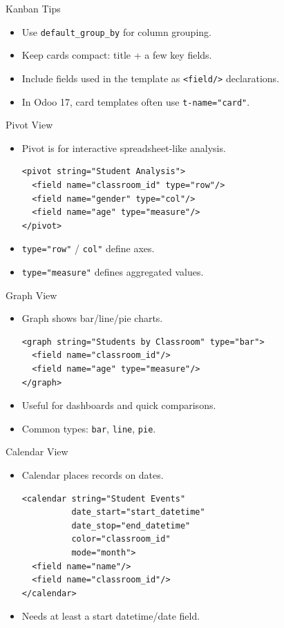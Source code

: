 \begin{frame}[fragile]{Kanban Tips}
	\begin{itemize}
		\item Use \texttt{default\_group\_by} for column grouping.
		\item Keep cards compact: title + a few key fields.
		\item Include fields used in the template as \texttt{<field/>} declarations.
		\item In Odoo 17, card templates often use \texttt{t-name="card"}.
	\end{itemize}
\end{frame}

\begin{frame}[fragile]{Pivot View}
	\begin{itemize}
		\item Pivot is for interactive spreadsheet-like analysis.
\begin{lstlisting}[style=xml]
<pivot string="Student Analysis">
  <field name="classroom_id" type="row"/>
  <field name="gender" type="col"/>
  <field name="age" type="measure"/>
</pivot>
\end{lstlisting}
		\item \texttt{type="row"} / \texttt{col"} define axes.
		\item \texttt{type="measure"} defines aggregated values.
	\end{itemize}
\end{frame}

\begin{frame}[fragile]{Graph View}
	\begin{itemize}
		\item Graph shows bar/line/pie charts.
\begin{lstlisting}[style=xml]
<graph string="Students by Classroom" type="bar">
  <field name="classroom_id"/>
  <field name="age" type="measure"/>
</graph>
\end{lstlisting}
		\item Useful for dashboards and quick comparisons.
		\item Common types: \texttt{bar}, \texttt{line}, \texttt{pie}.
	\end{itemize}
\end{frame}

\begin{frame}[fragile]{Calendar View}
	\begin{itemize}
		\item Calendar places records on dates.
\begin{lstlisting}[style=xml]
<calendar string="Student Events"
		  date_start="start_datetime"
		  date_stop="end_datetime"
		  color="classroom_id"
		  mode="month">
  <field name="name"/>
  <field name="classroom_id"/>
</calendar>
\end{lstlisting}
		\item Needs at least a start datetime/date field.
	\end{itemize}
\end{frame}

